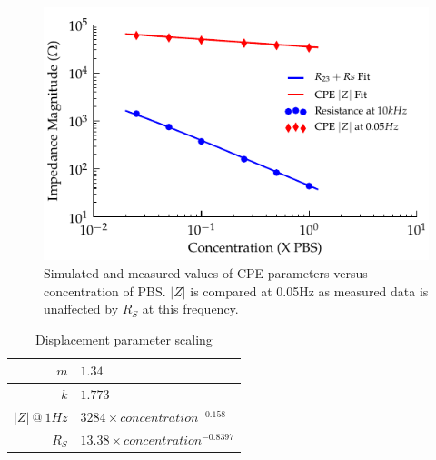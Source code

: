 \documentclass[journal, a4paper]{IEEEtran}
\begin{document}
{\begin{figure}
    \begin{center}
        \includegraphics{graphics/scalingFactors_Displacement_IEEE}
    \end{center}
    \caption{Simulated and measured values of CPE parameters versus concentration of PBS. $|Z|$ is compared at 0.05\thinspace Hz as measured data is unaffected by $R_{S}$ at this frequency.}
    \label{fig:CPE_Scaling}
\end{figure}

\begin{table}
    \begin{center}
        \begin{tabular}{|r|l|}
            \hline
            $m$ & $1.34$ \\ \hline
            $k$ & $1.773$\\ \hline
            $|Z|\: @\: 1Hz$& $3284 \times concentration^{-0.158}$ \\ \hline
            $R_{S}$ & $13.38 \times concentration^{-0.8397} $\\ \hline
        \end{tabular}
    \end{center}
    \caption{Displacement parameter scaling}
    \label{tab:CPEparams}
\end{table}

}
\end{document}
